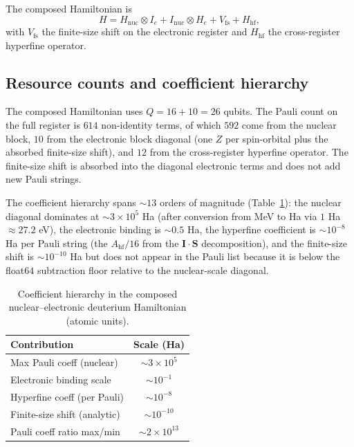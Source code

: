 \documentclass[twocolumn,prc,amsmath,amssymb,superscriptaddress]{revtex4-2}
\begin{document}
The composed Hamiltonian is
\begin{equation}
  H = H_{\mathrm{nuc}} \otimes I_{e}
    + I_{\mathrm{nuc}} \otimes H_{e}
    + V_{\mathrm{fs}} + H_{\mathrm{hf}},
\label{eq:composed-ne}
\end{equation}
with $V_{\mathrm{fs}}$ the finite-size shift on the electronic register
and $H_{\mathrm{hf}}$ the cross-register hyperfine operator.

\subsection{Resource counts and coefficient hierarchy}

The composed Hamiltonian uses $Q = 16 + 10 = 26$ qubits. The Pauli
count on the full register is $614$ non-identity terms, of which
$592$ come from the nuclear block, $10$ from the electronic block
diagonal (one $Z$ per spin-orbital plus the absorbed finite-size
shift), and $12$ from the cross-register hyperfine operator. The
finite-size shift is absorbed into the diagonal electronic terms and
does not add new Pauli strings.

The coefficient hierarchy spans $\sim 13$ orders of magnitude
(Table~\ref{tab:ne-scales}): the nuclear diagonal dominates at
$\sim 3 \times 10^5$ Ha (after conversion from MeV to
Ha via $1$ Ha $\approx 27.2$ eV), the electronic binding is $\sim 0.5$ Ha,
the hyperfine coefficient is $\sim 10^{-8}$ Ha per Pauli string (the
$A_{\mathrm{hf}}/16$ from the $\mathbf{I}\cdot\mathbf{S}$ decomposition),
and the finite-size shift is $\sim 10^{-10}$ Ha but does not appear in
the Pauli list because it is below the float$64$ subtraction floor
relative to the nuclear-scale diagonal.

\begin{table}[t]
  \centering
  \caption{Coefficient hierarchy in the composed nuclear--electronic
    deuterium Hamiltonian (atomic units).}
  \label{tab:ne-scales}
  \begin{ruledtabular}
  \begin{tabular}{lc}
    Contribution & Scale (Ha) \\
    \hline
    Max Pauli coeff (nuclear)    & $\sim 3 \times 10^{5}$ \\
    Electronic binding scale     & $\sim 10^{-1}$ \\
    Hyperfine coeff (per Pauli)  & $\sim 10^{-8}$ \\
    Finite-size shift (analytic) & $\sim 10^{-10}$ \\
    \hline
    Pauli coeff ratio max/min    & $\sim 2 \times 10^{13}$ \\
  \end{tabular}
  \end{ruledtabular}
\end{table}
\end{document}

